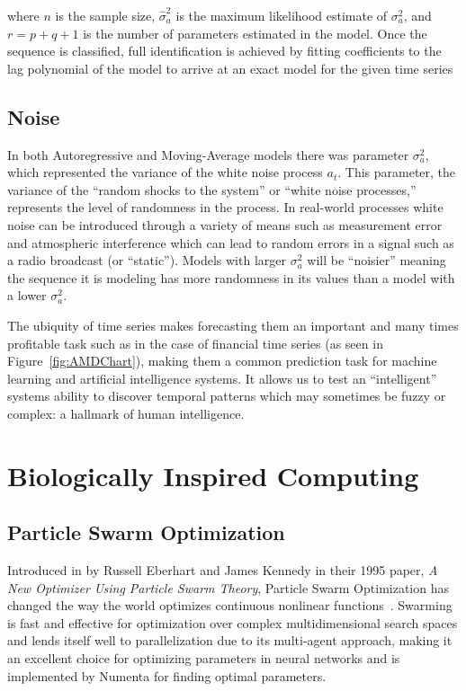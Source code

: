 \documentclass[oneside,12pt,openany]{book}
\begin{document}
	\noindent where $n$ is the sample size, $\hat{\sigma}_{a}^{2}$ is the maximum likelihood estimate of $\sigma_{a}^{2}$, and $r=p+q+1$ is the number of parameters estimated in the model. Once the sequence is classified, full identification is achieved by fitting coefficients to the lag polynomial of the model to arrive at an exact model for the given time series
    
    \section{Noise}
    
    In both Autoregressive and Moving-Average models there was parameter $\sigma_{a}^{2}$, which represented the variance of the white noise process $a_{t}$. This parameter, the variance of the ``random shocks to the system'' or ``white noise processes,'' represents the level of randomness in the process. In real-world processes white noise can be introduced through a variety of means such as measurement error and atmospheric interference which can lead to random errors in a signal such as a radio broadcast (or ``static''). Models with larger $\sigma_{a}^{2}$ will be ``noisier'' meaning the sequence it is modeling has more randomness in its values than a model with a lower $\sigma_{a}^{2}$.
	
	The ubiquity of time series makes forecasting them an important and many times profitable task such as in the case of financial time series (as seen in Figure~\ref{fig:AMDChart}), making them a common prediction task for machine learning and artificial intelligence systems. It allows us to test an ``intelligent'' systems ability to discover temporal patterns which may sometimes be fuzzy or complex: a hallmark of human intelligence.
	
	
	
	
	
	
	
	\chapter{Biologically Inspired Computing}
	
	\section{Particle Swarm Optimization}
	
	Introduced in by Russell Eberhart and James Kennedy in their 1995 paper, \textit{A New Optimizer Using Particle Swarm Theory}, Particle Swarm Optimization has changed the way the world optimizes continuous nonlinear functions~\cite{PSOReview}. Swarming is fast and effective for optimization over complex multidimensional search spaces and lends itself well to parallelization due to its multi-agent approach, making it an excellent choice for optimizing parameters in neural networks and is implemented by Numenta for finding optimal parameters.
	
\end{document}
